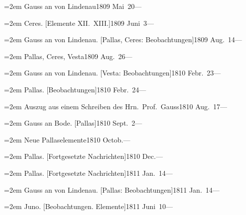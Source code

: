 \documentclass[12pt,a4paper]{article}
\begin{document}
{{{{{\vspace{0.5mm}
\noindent\hangindent=2em
Gauss an von Lindenau\hfill 1809 Mai\ 20\quad ---

\vspace{0.5mm}
\noindent\hangindent=2em
Ceres. [Elemente XII.\ XIII.]\hfill 1809 Juni\ 3\quad ---

\vspace{0.5mm}
\noindent\hangindent=2em
Gauss an von Lindenau. [Pallas, Ceres: Beobachtungen]\hfill 1809 Aug.\ 14\quad ---

\vspace{0.5mm}
\noindent\hangindent=2em
Pallas, Ceres, Vesta\hfill 1809 Aug.\ 26\quad ---

\vspace{0.5mm}
\noindent\hangindent=2em
Gauss an von Lindenau. [Vesta: Beobachtungen]\hfill 1810 Febr.\ 23\quad ---

\vspace{0.5mm}
\noindent\hangindent=2em
Pallas. [Beobachtungen]\hfill 1810 Febr.\ 24\quad ---

\vspace{0.5mm}
\noindent\hangindent=2em
Auszug aus einem Schreiben des Hrn.\ Prof.\ Gauss\hfill 1810 Aug.\ 17\quad ---

\vspace{0.5mm}
\noindent\hangindent=2em
Gauss an Bode. [Pallas]\hfill 1810 Sept.\ 2\quad ---

\vspace{0.5mm}
\noindent\hangindent=2em
Neue Pallaselemente\hfill 1810 Octob.\quad ---

\vspace{0.5mm}
\noindent\hangindent=2em
Pallas. [Fortgesetzte Nachrichten]\hfill 1810 Dec.\quad ---

\vspace{0.5mm}
\noindent\hangindent=2em
Pallas. [Fortgesetzte Nachrichten]\hfill 1811 Jan.\ 14\quad ---

\vspace{0.5mm}
\noindent\hangindent=2em
Gauss an von Lindenau. [Pallas: Beobachtungen]\hfill 1811 Jan.\ 14\quad ---

\vspace{0.5mm}
\noindent\hangindent=2em
Juno. [Beobachtungen. Elemente]\hfill 1811 Juni\ 10\quad ---

}}}}}
\end{document}
